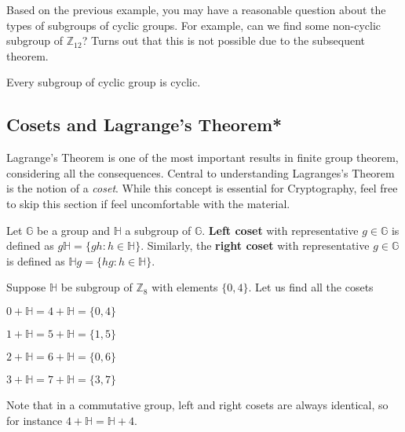 \documentclass[../lecture-notes-148x210.tex]{subfiles}
\begin{document}
Based on the previous example, you may have a reasonable question about the types of subgroups 
of cyclic groups. For example, can we find some non-cyclic subgroup of $\mathbb{Z}_{12}$? Turns 
out that this is not possible due to the subsequent theorem.

\begin{theorem}
    Every subgroup of cyclic group is cyclic.
\end{theorem}

\subsection{Cosets and Lagrange's Theorem*}
 
Lagrange's Theorem \cite[section 6]{Judson_2012} is one of the most important
results in finite group theorem, considering all the consequences. Central to
understanding Lagranges's Theorem is the notion of a \textit{coset}. While 
this concept is essential for Cryptography, feel free to skip this section if feel 
uncomfortable with the material.

\begin{definition}
    Let $\mathbb{G}$ be a group and $\mathbb{H}$ a subgroup of $\mathbb{G}$.
    \textbf{Left coset} with representative $g \in \mathbb{G}$ is defined as
    $g\mathbb{H} = \{gh : h \in \mathbb{H}\}$. Similarly, the \textbf{right
    coset} with representative $g \in \mathbb{G}$ is defined as $\mathbb{H}g =
    \{hg : h \in \mathbb{H}\}$.
\end{definition}

\begin{example}
    Suppose $\mathbb{H}$ be subgroup of $\mathbb{Z}_{8}$ with elements $\{0, 4\}$. 
    Let us find all the cosets
    \begin{center} %
        \vspace{-8mm}
        \item $0 + \mathbb{H} = 4 + \mathbb{H} = \{0, 4\}$
        \item $1 + \mathbb{H} = 5 + \mathbb{H} = \{1, 5\}$
        \item $2 + \mathbb{H} = 6 + \mathbb{H} = \{0, 6\}$
        \item $3 + \mathbb{H} = 7 + \mathbb{H} = \{3, 7\}$
    \end{center}
\end{example}

Note that in a commutative group, left and right cosets are always identical, so for instance $4+\mathbb{H}=\mathbb{H}+4$.
\end{document}
